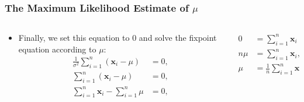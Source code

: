 \begin{frame}
  \frametitle{The Maximum Likelihood Estimate of $\mu$}
  \begin{columns}
    \begin{column}{0.5\textwidth}
      \begin{itemize}
      \item Finally, we set this equation to $0$ and solve the fixpoint equation according to $\mu$:
        \begin{align}
          \frac{1}{\sigma^2} \sum_{i=1}^{n} (\mathbf{x}_i-\mu) &= 0, \\
          \sum_{i=1}^{n} (\mathbf{x}_i-\mu) &= 0, \\
          \sum_{i=1}^{n} \mathbf{x}_i- \sum_{i=1}^{n} \mu &= 0,
        \end{align}
      \end{itemize}
    \end{column}
    \begin{column}{0.5\textwidth}
      \centering
      \begin{align}
        0 &= \sum_{i=1}^{n} \mathbf{x}_i- n \mu , \\
        n \mu &= \sum_{i=1}^{n} \mathbf{x}_i,\\
        \mu &= \frac{1}{n} \sum_{i=1}^{n}\mathbf{x}_i.
      \end{align}
    \end{column}
  \end{columns}
\end{frame}


